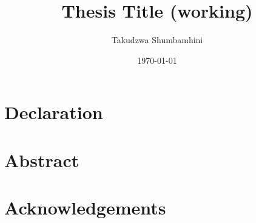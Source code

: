 \documentclass[12pt, a4paper, oneside]{book}
\title{Thesis Title (working)}
\author{Takudzwa Shumbamhini}
\date{\today}
\begin{document}
\frontmatter
\maketitle

\tableofcontents
\listoffigures
\listoftables

\chapter*{Declaration}

\chapter*{Abstract}


\chapter*{Acknowledgements}

\mainmatter








\appendix


\backmatter
\printbibliography
\end{document}
